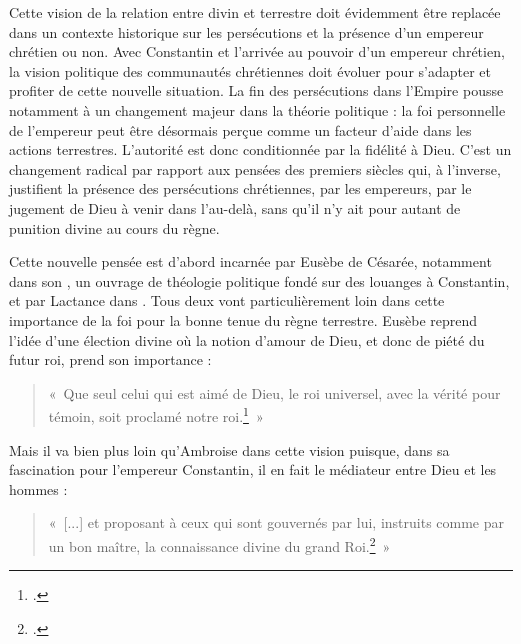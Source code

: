 \bigskip

Cette vision de la relation entre divin et terrestre doit évidemment être replacée dans un contexte historique sur les persécutions et la présence d'un empereur chrétien ou non. Avec Constantin et l’arrivée au pouvoir d’un empereur chrétien, la vision politique des communautés chrétiennes doit évoluer pour s’adapter et profiter de cette nouvelle situation. La fin des persécutions dans l’Empire pousse notamment à un changement majeur dans la théorie politique : la foi personnelle de l’empereur peut être désormais perçue comme un facteur d’aide dans les actions terrestres. L'autorité est donc conditionnée par la fidélité à Dieu. C’est un changement radical par rapport aux pensées des premiers siècles qui, à l'inverse, justifient la présence des persécutions chrétiennes, par les empereurs, par le jugement de Dieu à venir dans l’au-delà, sans qu’il n'y ait pour autant de punition divine au cours du règne.

\bigskip

Cette nouvelle pensée est d’abord incarnée par Eusèbe de Césarée, notamment dans son \autocite{eusebe_theologie_politique_2001}, un ouvrage de théologie politique fondé sur des louanges à Constantin, et par Lactance dans \autocite{lactance_mort_persecuteurs_1954}. Tous deux vont particulièrement loin dans cette importance de la foi pour la bonne tenue du règne terrestre. Eusèbe reprend l’idée d’une élection divine où la notion d’amour de Dieu, et donc de piété du futur roi, prend son importance :

\bigskip

\begin{quote}
«~Que seul celui qui est aimé de Dieu, le roi universel, avec la vérité pour témoin, soit proclamé notre roi.\footnote{\cite[\nopp II, 5]{eusebe_theologie_politique_2001}.}~»
\end{quote}

\bigskip

Mais il va bien plus loin qu’Ambroise dans cette vision puisque, dans sa fascination pour l’empereur Constantin, il en fait le médiateur entre Dieu et les hommes :

\bigskip

\begin{quote}
«~[...] et proposant à ceux qui sont gouvernés par lui, instruits comme par un bon maître, la connaissance divine du grand Roi.\footnote{\cite[\nopp II, 5]{eusebe_theologie_politique_2001}.}~»
\end{quote}

